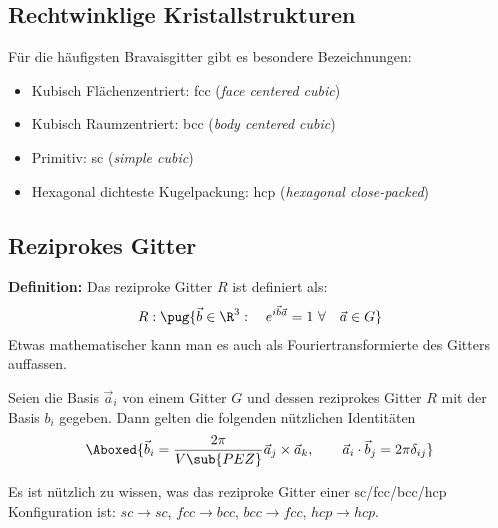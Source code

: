 \documentclass[bfvec]{summery_5.0}
\begin{document}
\subsection{Rechtwinklige Kristallstrukturen}
Für die häufigsten Bravaisgitter gibt es besondere Bezeichnungen:
\begin{itemize}
    \item Kubisch Flächenzentriert: fcc (\emph{face centered cubic})
    \item Kubisch Raumzentriert: bcc (\emph{body centered cubic})
    \item Primitiv: sc (\emph{simple cubic})
    \item Hexagonal dichteste Kugelpackung: hcp (\emph{hexagonal close-packed})
\end{itemize}

\subsection{Reziprokes Gitter}
\begin{boxA}
{\bf Definition:} Das reziproke Gitter $R$ ist definiert als:
\begin{align*}
    R: \pug{\vec b\in\R^3: \quad e^{i \vec b \vec a} = 1 \ \forall \quad \vec a\in G}
\end{align*} 
Etwas mathematischer kann man es auch als Fouriertransformierte des Gitters auffassen. 
\end{boxA}

Seien die Basis $\vec a_i$ von einem Gitter $G$ und dessen reziprokes Gitter $R$ mit der Basis $b_i$ gegeben. Dann gelten die folgenden nützlichen Identitäten
\begin{align*}
    \Aboxed{\vec b_i = \frac{2\pi}{V\sub{PEZ}}\vec a_j\times \vec a_k, \qquad \vec a_i \cdot \vec b_j = 2\pi \delta_{ij}}
\end{align*}

Es ist nützlich zu wissen, was das reziproke Gitter einer sc/fcc/bcc/hcp Konfiguration ist: $sc\to sc$, $fcc\to bcc$, $bcc \to fcc$, $hcp\to hcp$.
\end{document}
